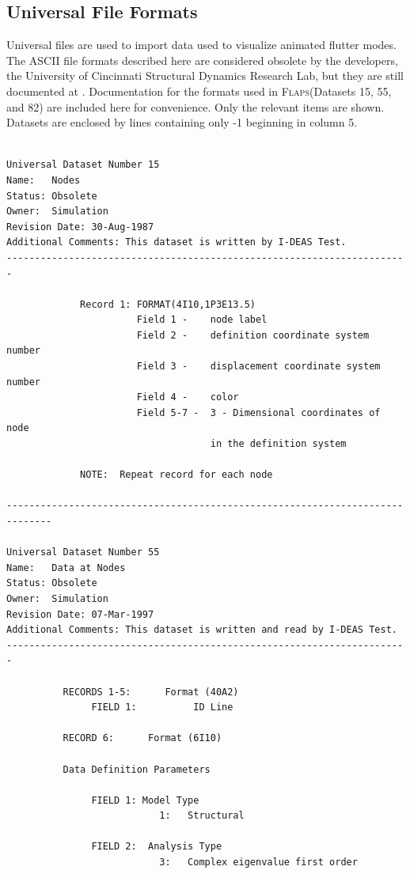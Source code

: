 \documentclass[11pt,openany,twoside]{book}
\numberwithin{equation}{section}		%
\newcommand{\Flaps}{\textsc{Flaps\:}}
\begin{document}
\subsection{Universal File Formats}\label{sect:universal-file}
Universal files are used to import data used to visualize animated
flutter modes.
The ASCII file formats described here are considered obsolete by the
developers, the University of Cincinnati Structural Dynamics Research Lab,
but they are still documented at \cite{UniversalFile}. Documentation for
the formats used in \Flaps (Datasets 15, 55, and 82) are included here
for convenience. Only the relevant items are shown. Datasets are enclosed
by lines containing only -1 beginning in column 5.
\par
\begin{verbatim}

Universal Dataset Number 15
Name:   Nodes
Status: Obsolete
Owner:  Simulation
Revision Date: 30-Aug-1987
Additional Comments: This dataset is written by I-DEAS Test.
-----------------------------------------------------------------------

             Record 1: FORMAT(4I10,1P3E13.5)
                       Field 1 -    node label
                       Field 2 -    definition coordinate system number
                       Field 3 -    displacement coordinate system number
                       Field 4 -    color
                       Field 5-7 -  3 - Dimensional coordinates of node
                                    in the definition system

             NOTE:  Repeat record for each node

------------------------------------------------------------------------------

Universal Dataset Number 55
Name:   Data at Nodes
Status: Obsolete
Owner:  Simulation
Revision Date: 07-Mar-1997
Additional Comments: This dataset is written and read by I-DEAS Test.
-----------------------------------------------------------------------

          RECORDS 1-5:      Format (40A2)
               FIELD 1:          ID Line

          RECORD 6:      Format (6I10)

          Data Definition Parameters

               FIELD 1: Model Type
                           1:   Structural

               FIELD 2:  Analysis Type
                           3:   Complex eigenvalue first order


\end{verbatim}
\end{document}
